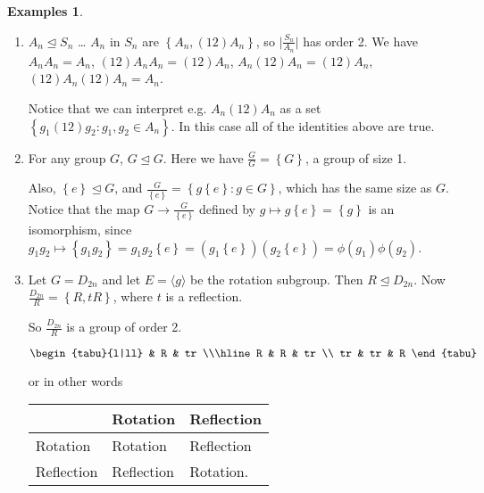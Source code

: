 \documentclass{article}
\theoremstyle{definition}
\newtheorem*{exmps}{Examples}
\newcommand{\gene}[1]{\langle #1 \rangle}
\begin{document}
\begin{exmps}\hfill
  \begin{enumerate}
    \item $A_n \trianglelefteq S_n$ \dots
      $A_n$ in $S_n$ are $\left\{ A_n , (12)A_n\right\}$, so
      $\big|\frac{S_n}{A_n}\big|$ has order 2. We have
      $A_nA_n = A_n$, $(12)A_nA_n=(12)A_n$, $A_n(12)A_n=(12)A_n$, $(12)A_n(12)A_n=A_n$.

      Notice that we can interpret e.g. $A_n(12)A_n$ as a set $\left\{ g_1(12)g_2 : g_1,g_2 \in A_n \right\}$. In this case all of the identities above are true.

    \item For any group $G$, $G \trianglelefteq G$. Here we have $\frac{G}{G}=\left\{ G \right\}$, a group of size 1.

      Also, $\left\{ e \right\} \trianglelefteq G$, and $\frac{G}{\left\{ e \right\}}=\left\{ g\left\{ e \right\}:g \in G \right\}$, which has the same size as $G$. Notice that the map $G \rightarrow \frac{G}{\left\{ e \right\}}$ defined by $g \mapsto g\left\{ e \right\}=\left\{ g \right\}$ is an isomorphism, since $g_1g_2 \mapsto \left\{ g_1g_2 \right\}=g_1g_2\left\{ e \right\}=(g_1\left\{ e \right\})(g_2\left\{ e \right\})=\phi(g_1)\phi(g_2)$. 


\newpage
    \item Let $G=D_{2n}$ and let $E = \gene{g}$ be the rotation subgroup. Then $R \trianglelefteq D_{2n}$. Now $\frac{D_{2n}}{R}=\left\{ R,tR \right\}$, where $t$ is a reflection.

      So $\frac{D_{2n}}{R}$ is a group of order 2.

      \begin{table}[h]
        \centering
        $\begin{tabu}{l|ll}
          & R & tr \\\hline
        R & R & tr \\
        tr & tr & R
        \end{tabu}$
        \label{tab:d2ntable}
      \end{table}
      or in other words

      \begin{table}[h]
        \centering
        \begin{tabular}{l|ll}
          & Rotation & Reflection\\\hline
          Rotation & Rotation & Reflection\\
          Reflection & Reflection & Rotation.
        \end{tabular}
        \label{tab:rottable}
      \end{table}
  \end{enumerate}

\end{exmps}
\end{document}
